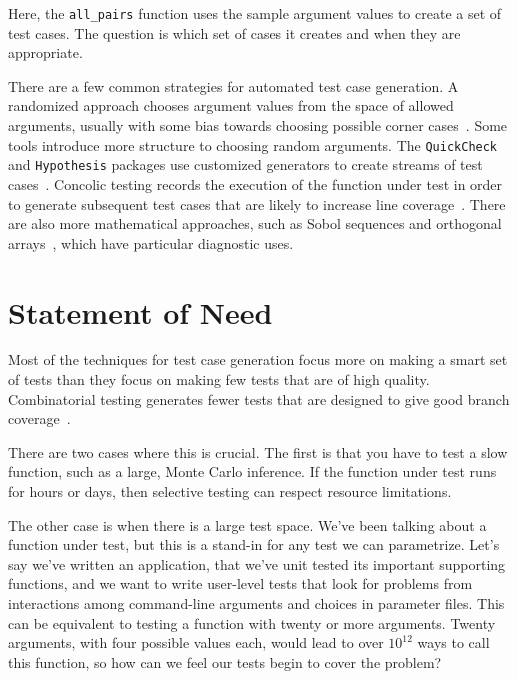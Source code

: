 \documentclass{juliacon}
\begin{document}
Here, the \verb|all_pairs| function uses the sample argument values to create a set of test cases. The question is which set of cases it creates and when they are appropriate.

\vskip 6pt
There are a few common strategies for automated test case generation. A randomized approach chooses argument values from the space of allowed arguments, usually with some bias towards choosing possible corner cases~\cite{Lampropoulos2020-sd,Arcuri2012-az}. Some tools introduce more structure to choosing random arguments. The \texttt{QuickCheck} and \texttt{Hypothesis} packages use customized generators to create streams of test cases~\cite{loscher2018automating}. Concolic testing records the execution of the function under test in order to generate subsequent test cases that are likely to increase line coverage~\cite{King1976-jt,Wang2018-xh,vira2019}. There are also more mathematical approaches, such as Sobol sequences and orthogonal arrays~\cite{He2013-th}, which have particular diagnostic uses.


\section{Statement of Need}\label{sec:statement-of-need}

Most of the techniques for test case generation focus more on making a smart set of tests than they focus on making few tests that are of high quality. Combinatorial testing generates fewer tests that are designed to give good branch coverage~\cite{Nie2011-yl,Grindal2005-su,Kuhn2010-ak}.

\vskip 6pt
There are two cases where this is crucial. The first is that you have to test a slow function, such as a large, Monte Carlo inference. If the function under test runs for hours or days, then selective testing can respect resource limitations.

\vskip 6pt
The other case is when there is a large test space. We've been talking about a function under test, but this is a stand-in for any test we can parametrize. Let's say we've written an application, that we've unit tested its important supporting functions, and we want to write user-level tests that look for problems from interactions among command-line arguments and choices in parameter files. This can be equivalent to testing a function with twenty or more arguments. Twenty arguments, with four possible values each, would lead to over $10^{12}$ ways to call this function, so how can we feel our tests begin to cover the problem?
\end{document}
